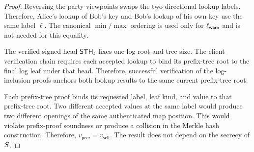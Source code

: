 \begin{proof}
Reversing the party viewpoints swaps the two directional lookup labels. Therefore, Alice's lookup
of Bob's key and Bob's lookup of his own key use the same label $\ell$. The canonical
$\min/\max$ ordering is used only for $\ell_{\mathsf{warn}}$ and is not needed for this equality.

The verified signed head $\mathsf{STH}_t$ fixes one log root and tree size. The client verification chain
requires each accepted lookup to bind its prefix-tree root to the final log leaf under that head.
Therefore, successful verification of the log-inclusion proofs anchors both lookup results to the
same current prefix-tree root.

Each prefix-tree proof binds its requested label, leaf kind, and value to that prefix-tree root. Two
different accepted values at the same label would produce two different openings of the same
authenticated map position. This would violate prefix-proof soundness or produce a collision in the
Merkle hash construction. Therefore,
$v_{\mathsf{peer}}=v_{\mathsf{self}}$. The result does not depend on the secrecy of $S$.
\end{proof}


